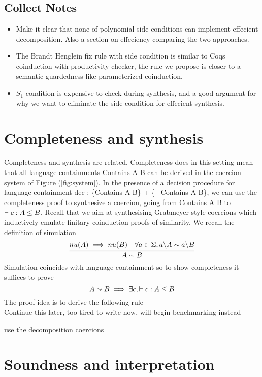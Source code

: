 \documentclass[a4paper,UKenglish,cleveref, autoref, thm-restate]{lipics-v2021}
\begin{document}
\subsection{Collect Notes}
\begin{itemize}
\item Make it clear that none of polynomial side conditions can implement effecient decomposition. Also a section on effeciency comparing the two approaches.\\
\item  The Brandt Henglein fix rule with side condition is similar to Coqs coinduction with productivity checker, the rule we propose is closer to a semantic guardedness like parameterized coinduction.\\
\item  $S_1$ condition is expensive to check during synthesis, and a good argument for why we want to eliminate the side condition for effecient synthesis.\\
\end{itemize}
\section{Completeness and synthesis}
Completeness and synthesis are related. Completeness does in this setting mean that all language containments \textsf{Contains A B} can be derived in the coercion system of Figure (\ref{fig:system}). In the presence of a decision procedure for language containment \textsf{dec : \{Contains A B\} + \{~ Contains A B\}}, we can use the completeness proof to synthesize a coercion, going from \textsf{Contains A B} to $\contains{}{c}{A}{B}$.
 Recall that we aim at synthesising Grabmeyer style coercions which inductively emulate finitary coinduction proofs of similarity. We recall the definition of simulation
\[\infer={A \sim B}{\mynu{A} \implies \mynu{B} & \forall a \in \Sigma, \derive{a}{A} \sim \derive{a}{B} }\]
Simulation coincides with language containment so to show completeness it suffices to prove
\[ A \sim B \implies \exists c, \contains{}{c}{A}{B} \]
The proof idea is to derive the following rule\\ Continue this later, too tired to write now, will begin benchmarking instead

 use the decomposition coercions 


\section{Soundness and interpretation}
\end{document}
